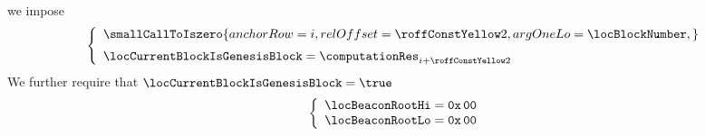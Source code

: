 \item[\underline{\underline{Detecting the genesis block:}}]
	we impose
	\[
		\left\{ \begin{array}{l}
			\smallCallToIszero {
				anchorRow = i                          ,
				relOffset = \FSEEgenesisBlockRowOffset ,
				argOneLo  = \locBlockNumber            ,
			}
			\vspace{2mm} \\
			\locCurrentBlockIsGenesisBlock
			=
			\computationRes _{i + \FSEEgenesisBlockRowOffset} \\
		\end{array} \right.
	\]
	We further require that
	\If $\locCurrentBlockIsGenesisBlock = \true$
	\Then
	\[
		\left\{ \begin{array}{l}
			\locBeaconRootHi = \texttt{0x\,00} \\
			\locBeaconRootLo = \texttt{0x\,00} \\
		\end{array} \right.
	\]
